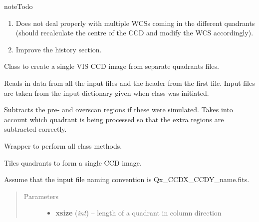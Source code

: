 \documentclass[a4paper,12pt,english]{sphinxmanual}
\begin{document}
\begin{notice}{note}{Todo}
\begin{enumerate}
\item {} 
Does not deal properly with multiple WCSs coming in the different quadrants (should recalculate the
centre of the CCD and modify the WCS accordingly).

\item {} 
Improve the history section.

\end{enumerate}
\end{notice}

\begin{fulllineitems}
\label{postproc:postproc.tileCCD.tileCCD}
Class to create a single VIS CCD image from separate quadrants files.

\begin{fulllineitems}
\label{postproc:postproc.tileCCD.tileCCD.readData}
Reads in data from all the input files and the header from the first file.
Input files are taken from the input dictionary given when class was initiated.

Subtracts the pre- and overscan regions if these were simulated. Takes into account
which quadrant is being processed so that the extra regions are subtracted correctly.

\end{fulllineitems}


\begin{fulllineitems}
\label{postproc:postproc.tileCCD.tileCCD.runAll}
Wrapper to perform all class methods.

\end{fulllineitems}


\begin{fulllineitems}
\label{postproc:postproc.tileCCD.tileCCD.tileCCD}
Tiles quadrants to form a single CCD image.

Assume that the input file naming convention is Qx\_CCDX\_CCDY\_name.fits.
\begin{quote}\begin{description}
\item[{Parameters}] \leavevmode\begin{itemize}
\item {} 
\textbf{xsize} (\emph{int}) -- length of a quadrant in column direction


\end{itemize}
\end{description}
\end{quote}
\end{fulllineitems}
\end{fulllineitems}
\end{document}
